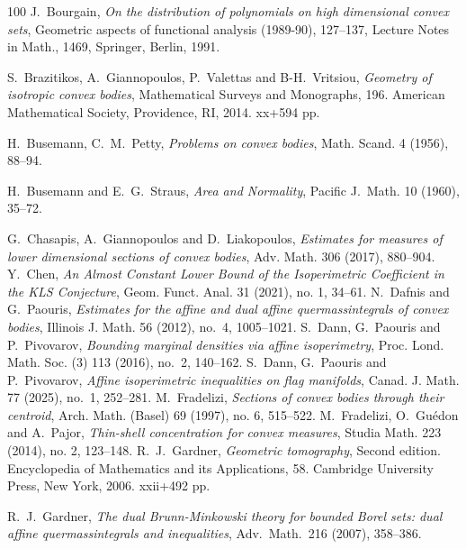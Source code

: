 \documentclass[11pt,leqno]{article}
\theoremstyle{definition}
\theoremstyle{remark}
\numberwithin{equation}{section}
\newcommand{\1}{\textbf{1}}
\begin{document}
\begin{thebibliography}{100}
 \textrm{J.\ Bourgain}, \textit{On the distribution of polynomials on high dimensional convex sets},
Geometric aspects of functional analysis (1989-90), 127--137, Lecture Notes in Math., 1469, Springer, Berlin, 1991.


 {S.~Brazitikos, A.~Giannopoulos, P.~Valettas and B-H.~Vritsiou},
\textit{Geometry of isotropic convex bodies}, Mathematical Surveys and Monographs, 196.
American Mathematical Society, Providence, RI, 2014. xx+594 pp.

 {H.~Busemann, C.~M.~Petty,} \textit{Problems on convex
bodies}, Math. Scand. {4} (1956), 88--94.

 {H.~Busemann and E.~G.~Straus}, \textit{Area and Normality},
Pacific J.\ Math. {10} (1960), 35--72.

 {G.~Chasapis, A.~Giannopoulos and D.~Liakopoulos},
\textit{Estimates for measures of lower dimensional sections of convex bodies}, Adv. Math. {306}
(2017), 880--904.
 \textrm{Y.~Chen}, \textit{An Almost Constant Lower Bound of the Isoperimetric Coefficient in the KLS Conjecture},
Geom. Funct. Anal. {31} (2021), no. 1, 34--61.
\textrm{N.\ Dafnis and G.\ Paouris}, {\sl Estimates for the affine and dual affine quermassintegrals of convex bodies}, Illinois J. Math. 56 (2012), no.~4, 1005--1021. 
 {\rm S.~Dann, G.~Paouris and P.~Pivovarov}, \textit{Bounding marginal densities via affine
isoperimetry},   Proc. Lond. Math. Soc. (3) 113 (2016), no.~2, 140--162.
 {\rm S.~Dann, G.~Paouris and P.~Pivovarov}, \textit{Affine isoperimetric
inequalities on flag manifolds},  Canad. J. Math. 77 (2025), no.~1, 252--281.
 {\rm M.\ Fradelizi}, {\sl Sections of convex bodies through their centroid},
Arch. Math. (Basel) {69} (1997), no. 6, 515--522.
 {\rm M.~Fradelizi, O.~Gu\'{e}don and A.~Pajor},
\textit{Thin-shell concentration for convex measures}, Studia Math. 223 (2014), no. 2, 123--148.
 {R.~J.~Gardner}, \textit{Geometric tomography}, Second edition. Encyclopedia of Mathematics
and its Applications, 58. Cambridge University Press, New York, 2006. xxii+492 pp.

 {R.~J.~Gardner}, \textit{The dual Brunn-Minkowski theory for bounded Borel sets: dual affine
quermassintegrals and inequalities}, Adv.\ Math.\ {216} (2007), 358--386.


\end{thebibliography}
\end{document}
